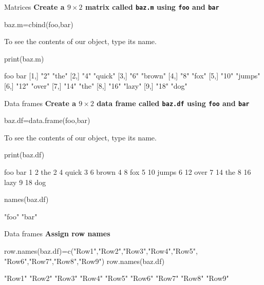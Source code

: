 \documentclass{beamer}\usepackage[]{graphicx}\usepackage[]{color}
\begin{document}
\begin{frame}[fragile]{Matrices}
  \textbf{Create a $9\times 2$ matrix called \texttt{baz.m} using \texttt{foo} and \texttt{bar}}
\begin{Schunk}
\begin{Sinput}
baz.m=cbind(foo,bar)
\end{Sinput}
\end{Schunk}
To see the contents of our object, type its name.
\begin{Schunk}
\begin{Sinput}
print(baz.m)
\end{Sinput}
\begin{Soutput}
      foo  bar    
 [1,] "2"  "the"  
 [2,] "4"  "quick"
 [3,] "6"  "brown"
 [4,] "8"  "fox"  
 [5,] "10" "jumps"
 [6,] "12" "over" 
 [7,] "14" "the"  
 [8,] "16" "lazy" 
 [9,] "18" "dog"  
\end{Soutput}
\end{Schunk}
\end{frame}

\begin{frame}[fragile]{Data frames}
  \textbf{Create a $9\times 2$ data frame called \texttt{baz.df} using \texttt{foo} and \texttt{bar}}
\begin{Schunk}
\begin{Sinput}
baz.df=data.frame(foo,bar)
\end{Sinput}
\end{Schunk}
To see the contents of our object, type its name.
\begin{Schunk}
\begin{Sinput}
print(baz.df)
\end{Sinput}
\begin{Soutput}
  foo   bar
1   2   the
2   4 quick
3   6 brown
4   8   fox
5  10 jumps
6  12  over
7  14   the
8  16  lazy
9  18   dog
\end{Soutput}
\begin{Sinput}
names(baz.df)
\end{Sinput}
\begin{Soutput}
[1] "foo" "bar"
\end{Soutput}
\end{Schunk}
\end{frame}

\begin{frame}[fragile]{Data frames}
  \textbf{Assign row names}
\begin{Schunk}
\begin{Sinput}
row.names(baz.df)=c("Row1","Row2","Row3","Row4","Row5",
                    "Row6","Row7","Row8","Row9")
row.names(baz.df)
\end{Sinput}
\begin{Soutput}
[1] "Row1" "Row2" "Row3" "Row4" "Row5" "Row6" "Row7" "Row8" "Row9"
\end{Soutput}
\end{Schunk}
\end{frame}
\end{document}
